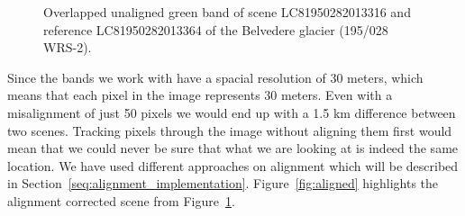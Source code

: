 \documentclass[11pt, a4paper]{report}
\begin{document}
\begin{figure}[h]
\begin{minipage}{0.45\textwidth}
	\end{minipage}
	\caption{Overlapped unaligned green band of scene LC81950282013316 and reference LC81950282013364 of the Belvedere glacier (195/028 WRS-2).}
	\label{fig:unaligned}	
	\end{figure}
	Since the bands we work with have a spacial resolution of 30 meters, which means that each pixel in the image represents 30 meters. Even with a misalignment of just 50 pixels we would end up with a 1.5 km difference between two scenes. Tracking pixels through the image without aligning them first would mean that we could never be sure that what we are looking at is indeed the same location. We have used different approaches on alignment which will be described in Section~\ref{seq:alignment_implementation}. Figure~\ref{fig:aligned} highlights the alignment corrected scene from Figure~\ref{fig:unaligned}. 
\end{document}
